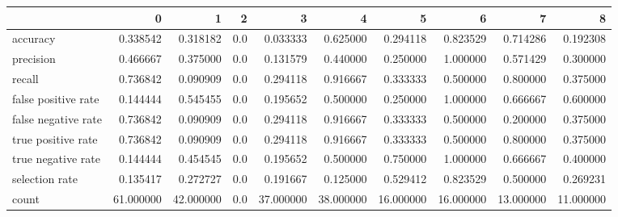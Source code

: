 \begin{tabular}{lrrrrrrrrr}
\toprule
{} &          0 &          1 &    2 &          3 &          4 &          5 &          6 &          7 &          8 \\
\midrule
accuracy            &   0.338542 &   0.318182 &  0.0 &   0.033333 &   0.625000 &   0.294118 &   0.823529 &   0.714286 &   0.192308 \\
precision           &   0.466667 &   0.375000 &  0.0 &   0.131579 &   0.440000 &   0.250000 &   1.000000 &   0.571429 &   0.300000 \\
recall              &   0.736842 &   0.090909 &  0.0 &   0.294118 &   0.916667 &   0.333333 &   0.500000 &   0.800000 &   0.375000 \\
false positive rate &   0.144444 &   0.545455 &  0.0 &   0.195652 &   0.500000 &   0.250000 &   1.000000 &   0.666667 &   0.600000 \\
false negative rate &   0.736842 &   0.090909 &  0.0 &   0.294118 &   0.916667 &   0.333333 &   0.500000 &   0.200000 &   0.375000 \\
true positive rate  &   0.736842 &   0.090909 &  0.0 &   0.294118 &   0.916667 &   0.333333 &   0.500000 &   0.800000 &   0.375000 \\
true negative rate  &   0.144444 &   0.454545 &  0.0 &   0.195652 &   0.500000 &   0.750000 &   1.000000 &   0.666667 &   0.400000 \\
selection rate      &   0.135417 &   0.272727 &  0.0 &   0.191667 &   0.125000 &   0.529412 &   0.823529 &   0.500000 &   0.269231 \\
count               &  61.000000 &  42.000000 &  0.0 &  37.000000 &  38.000000 &  16.000000 &  16.000000 &  13.000000 &  11.000000 \\
\bottomrule
\end{tabular}
